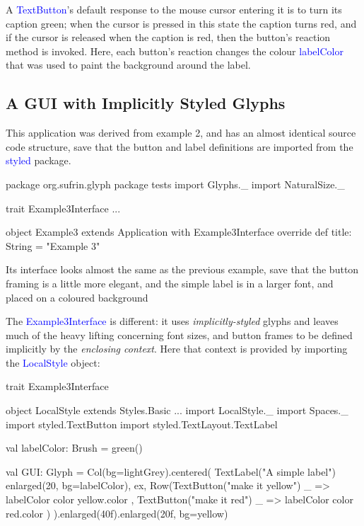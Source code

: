 \documentclass[12pt,a4paper]{article}
\def\Scala#1{\textcolor{blue}{\textsf{#1}}}
\def\SS#1{\subsection{#1}}
\begin{document}
A \Scala{TextButton}'s default response to the mouse cursor entering
it is to turn its caption green; when the cursor is pressed in this
state the caption turns red, and if the cursor is released when the
caption is red, then the button's reaction method is invoked. Here,
each button's reaction changes the colour \Scala{labelColor} that
was used to paint the background around the label.



\SS{A GUI with Implicitly Styled Glyphs}

This application was derived from example 2, and has an almost
identical source code structure, save that the button and label
definitions are imported from the \Scala{styled} package.

\begin{scala}
package org.sufrin.glyph
package tests
import  Glyphs._
import  NaturalSize._

trait Example3Interface { ... }

object Example3 extends Application  with Example3Interface {
  override def title: String = "Example 3"
}
\end{scala}

Its interface looks almost the same as the previous example, save
that the button framing is a little more elegant, and the simple
label is in a larger font, and placed on a coloured background

\begin{center}
\end{center}

The \Scala{Example3Interface} is different: it uses \textit{implicitly-styled}
glyphs and leaves much of the heavy lifting concerning font sizes, and button
frames to be defined implicitly by the \textit{enclosing context}. Here that
context is provided by importing the  \Scala{LocalStyle} object:

\begin{scala}
trait Example3Interface {
  object LocalStyle extends Styles.Basic { ... }
  import LocalStyle._
  import Spaces._
  import styled.TextButton
  import styled.TextLayout.TextLabel

  val labelColor: Brush = green()

  val GUI: Glyph = Col(bg=lightGrey).centered(
    TextLabel("A simple label") enlarged(20, bg=labelColor), ex,
    Row(TextButton("make it yellow") { _ => labelColor color yellow.color },
        TextButton("make it red")    { _ => labelColor color red.color })
  ).enlarged(40f).enlarged(20f, bg=yellow)

}
\end{scala}
\end{document}
